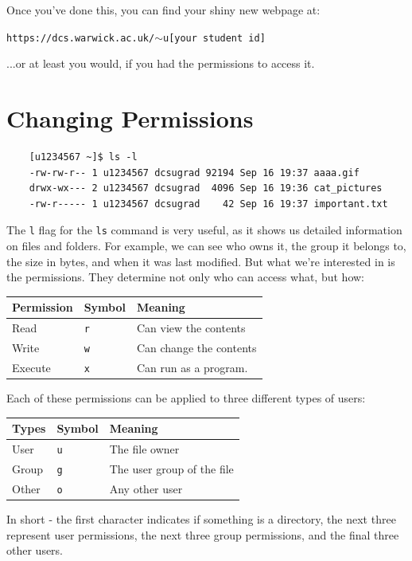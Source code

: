 \documentclass[a4paper,11pt,parskip=half-]{scrartcl}
\begin{document}
Once you've done this, you can find your shiny new webpage at:

\qquad \texttt{https://dcs.warwick.ac.uk/$\sim$u[your student id]}

...or at least you would, if you had the permissions to access it.

\section*{Changing Permissions}

\begin{verbatim}
    [u1234567 ~]$ ls -l
    -rw-rw-r-- 1 u1234567 dcsugrad 92194 Sep 16 19:37 aaaa.gif
    drwx-wx--- 2 u1234567 dcsugrad  4096 Sep 16 19:36 cat_pictures
    -rw-r----- 1 u1234567 dcsugrad    42 Sep 16 19:37 important.txt
\end{verbatim}

The \texttt{l} flag for the \texttt{ls} command is very useful, as it shows us detailed information on files and folders. 
For example, we can see who owns it, the group it belongs to, the size in bytes, and when it was last modified. 
But what we're interested in is the permissions. 
They determine not only who can access what, but how:

\centering
\begin{tabular}{l|l|l}
    Permission & Symbol & Meaning \\
    \hline
    Read & \texttt{r} & Can view the contents \\
    Write & \texttt{w} & Can change the contents \\
    Execute & \texttt{x} & Can run as a program.
\end{tabular}

\raggedright

Each of these permissions can be applied to three different types of users:

\centering
\begin{tabular}{l|l|l}
    Types & Symbol & Meaning \\
    \hline
    User & \texttt{u} & The file owner \\
    Group & \texttt{g} & The user group of the file \\
    Other & \texttt{o} & Any other user
\end{tabular}

\raggedright

In short - the first character indicates if something is a directory, the next three represent user permissions, the next three group permissions, and the final three other users.
\end{document}
